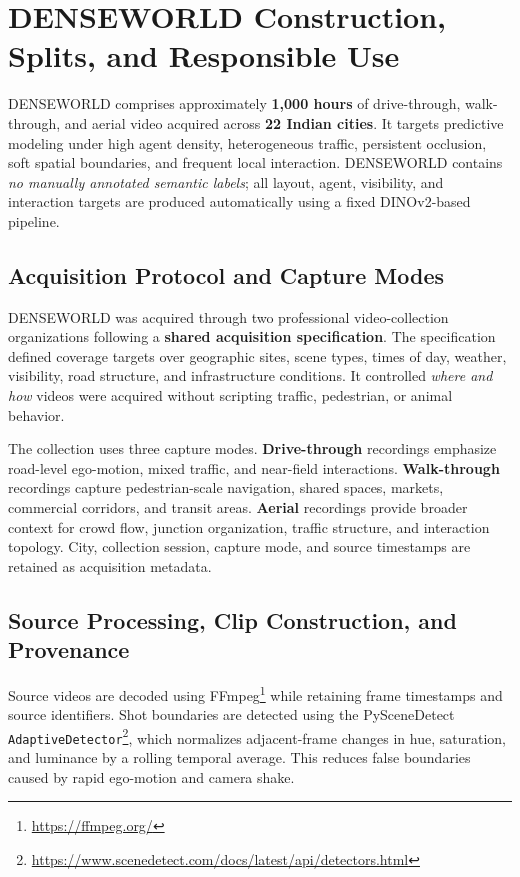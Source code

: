 \section{DENSEWORLD Construction, Splits, and Responsible Use}
\label{app:dataset}

DENSEWORLD comprises approximately \textbf{1,000 hours} of
drive-through, walk-through, and aerial video acquired across
\textbf{22 Indian cities}. It targets predictive modeling under high
agent density, heterogeneous traffic, persistent occlusion, soft spatial
boundaries, and frequent local interaction. DENSEWORLD contains
\emph{no manually annotated semantic labels}; all layout, agent,
visibility, and interaction targets are produced automatically using a
fixed DINOv2-based pipeline.

\subsection{Acquisition Protocol and Capture Modes}
\label{app:dataset_acquisition}

DENSEWORLD was acquired through two professional video-collection
organizations following a \textbf{shared acquisition specification}.
The specification defined coverage targets over geographic sites,
scene types, times of day, weather, visibility, road structure, and
infrastructure conditions. It controlled \emph{where and how} videos
were acquired without scripting traffic, pedestrian, or animal
behavior.

The collection uses three capture modes. \textbf{Drive-through}
recordings emphasize road-level ego-motion, mixed traffic, and
near-field interactions. \textbf{Walk-through} recordings capture
pedestrian-scale navigation, shared spaces, markets, commercial
corridors, and transit areas. \textbf{Aerial} recordings provide broader
context for crowd flow, junction organization, traffic structure, and
interaction topology. City, collection session, capture mode, and
source timestamps are retained as acquisition metadata.

\subsection{Source Processing, Clip Construction, and Provenance}
\label{app:clip_construction}

Source videos are decoded using
FFmpeg\footnote{\url{https://ffmpeg.org/}} while retaining frame
timestamps and source identifiers. Shot boundaries are detected using
the PySceneDetect
\texttt{AdaptiveDetector}\footnote{\url{https://www.scenedetect.com/docs/latest/api/detectors.html}},
which normalizes adjacent-frame changes in hue, saturation, and
luminance by a rolling temporal average. This reduces false boundaries
caused by rapid ego-motion and camera shake.

